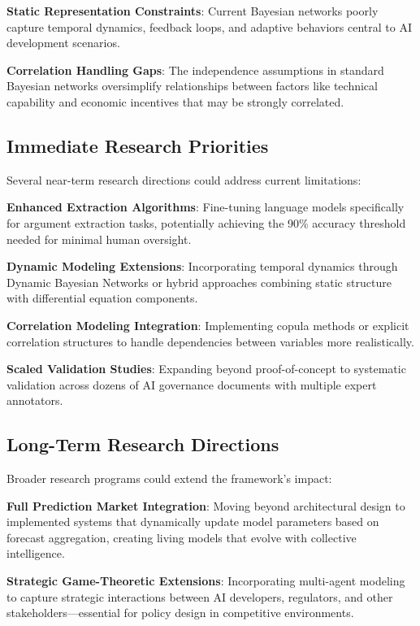 \documentclass[
  11pt,
  letterpaper,
]{book}
\begin{document}
\textbf{Static Representation Constraints}: Current Bayesian networks
poorly capture temporal dynamics, feedback loops, and adaptive behaviors
central to AI development scenarios.

\textbf{Correlation Handling Gaps}: The independence assumptions in
standard Bayesian networks oversimplify relationships between factors
like technical capability and economic incentives that may be strongly
correlated.

\subsection{Immediate Research
Priorities}\label{sec-immediate-priorities}

Several near-term research directions could address current limitations:

\textbf{Enhanced Extraction Algorithms}: Fine-tuning language models
specifically for argument extraction tasks, potentially achieving the
90\% accuracy threshold needed for minimal human oversight.

\textbf{Dynamic Modeling Extensions}: Incorporating temporal dynamics
through Dynamic Bayesian Networks or hybrid approaches combining static
structure with differential equation components.

\textbf{Correlation Modeling Integration}: Implementing copula methods
or explicit correlation structures to handle dependencies between
variables more realistically.

\textbf{Scaled Validation Studies}: Expanding beyond proof-of-concept to
systematic validation across dozens of AI governance documents with
multiple expert annotators.

\subsection{Long-Term Research
Directions}\label{sec-long-term-directions}

Broader research programs could extend the framework's impact:

\textbf{Full Prediction Market Integration}: Moving beyond architectural
design to implemented systems that dynamically update model parameters
based on forecast aggregation, creating living models that evolve with
collective intelligence.

\textbf{Strategic Game-Theoretic Extensions}: Incorporating multi-agent
modeling to capture strategic interactions between AI developers,
regulators, and other stakeholders---essential for policy design in
competitive environments.
\end{document}
